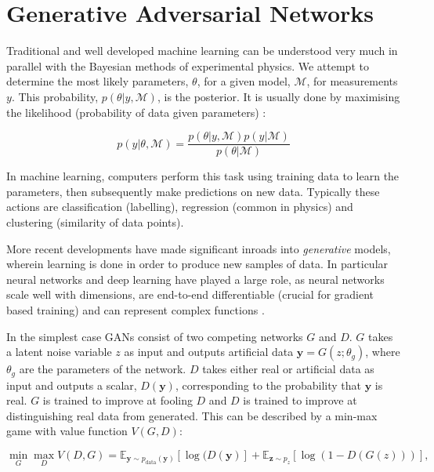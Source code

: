 \documentclass{report}
\begin{document}
 
\section{Generative Adversarial Networks}
\label{sec:ml}

Traditional and well developed machine learning can be understood very much in parallel with the Bayesian methods of experimental physics. We attempt to determine the most likely parameters, $\theta$, for a given model, $\mathcal{M}$, for measurements $y$. This probability, $p(\theta|y, \mathcal{M})$, is the posterior. It is usually done by maximising the likelihood (probability of data given parameters) \cite{data}:

\[
p(y|\theta, \mathcal{M}) = \frac{p(\theta|y, \mathcal{M})p(y|\mathcal{M})}{p(\theta|\mathcal{M})}
\]

In machine learning, computers perform this task using training data to learn the parameters, then subsequently make predictions on new data. Typically these actions are classification (labelling), regression (common in physics) and clustering (similarity of data points). 

More recent developments have made significant inroads into \textit{generative} models, wherein learning is done in order to produce new samples of data. In particular neural networks and deep learning have played a large role, as neural networks scale well with dimensions, are end-to-end differentiable (crucial for gradient based training) and can represent complex functions \cite{deepgen}.


In the simplest case GANs consist of two competing networks $G$ and $D$. $G$ takes a latent noise variable $z$ as input and outputs artificial data $\mathbf{y} = G(z;\theta_g)$, where $\theta_g$ are the parameters of the network. $D$ takes either real or artificial data as input and outputs a scalar, $D(\mathbf{y})$, corresponding to the probability that $\mathbf{y}$ is real. $G$ is trained to improve at fooling $D$ and $D$ is trained to improve at distinguishing real data from generated. This can be described by a min-max game with value function $V(G,D)$:

\begin{equation}
	\label{eq:minmax}
	\min_{G}\max_{D}V(D,G) = \mathbb{E}_{\mathbf{y}\sim p_{\text{data}}(\mathbf{y})} [\log(D(\mathbf{y})] + \mathbb{E}_{\mathbf{z}\sim p_{z}} [\log(1-D(G(z)))], 
\end{equation} 
\end{document}
